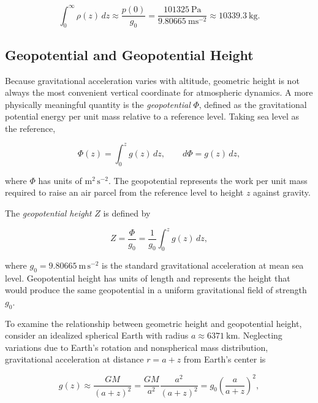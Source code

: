 \documentclass[10pt,twocolumn]{memoir}
\begin{document}
\begin{equation}
    \int_0^\infty \rho(z)\,dz \approx \frac{p(0)}{g_0} = \frac{101325\ \mathrm{Pa}}{9.80665\ \mathrm{ms^{-2}}} \approx 10339.3\ \mathrm{kg}.
\end{equation}

\subsection{Geopotential and Geopotential Height}

Because gravitational acceleration varies with altitude, geometric height is not always the most convenient vertical coordinate for atmospheric dynamics. A more physically meaningful quantity is the \textit{geopotential} $\Phi$, defined as the gravitational potential energy per unit mass relative to a reference level. Taking sea level as the reference,

\begin{equation}
    \Phi(z)=\int_0^z g(z)\,dz, \qquad d\Phi=g(z)\,dz,
\label{eq:c1_geopotential_static}
\end{equation}

where $\Phi$ has units of $\mathrm{m^2\,s^{-2}}$. The geopotential represents the work per unit mass required to raise an air parcel from the reference level to height $z$ against gravity.

The \textit{geopotential height} $Z$ is defined by

\begin{equation}
    Z=\frac{\Phi}{g_0} = \frac{1}{g_0}\int_0^z g(z)\,dz,
\label{eq:c1_geopotential_height_static}
\end{equation}

where $g_0=9.80665\ \mathrm{m\,s^{-2}}$ is the standard gravitational acceleration at mean sea level. Geopotential height has units of length and represents the height that would produce the same geopotential in a uniform gravitational field of strength $g_0$.

To examine the relationship between geometric height and geopotential height, consider an idealized spherical Earth with radius $a\approx6371\ \mathrm{km}$. Neglecting variations due to Earth's rotation and nonspherical mass distribution, gravitational acceleration at distance $r=a+z$ from Earth's center is

\begin{equation}
    g(z)\approx\frac{GM}{(a+z)^2} = \frac{GM}{a^2}\frac{a^2}{(a+z)^2} = g_0\left(\frac{a}{a+z}\right)^2,
\end{equation}
\end{document}
